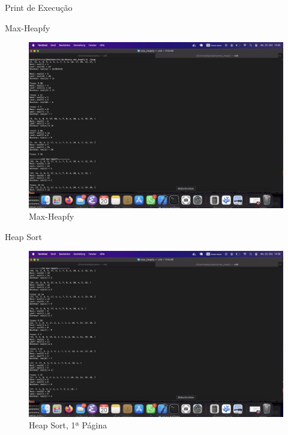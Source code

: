 \documentclass{article}
\begin{document}
    \vspace{0.9cm}

    \centerline{\Large Print de Execução}

    \vspace{0.5cm}

    \centerline{\Huge Max-Heapfy}

    \begin{figure}
        \centering
        \includegraphics[width=1.3\linewidth]{max_heapfy.png}
        \caption{Max-Heapfy}
        \label{fig:fig1}
    \end{figure}

    \clearpage

    \centerline{\Huge Heap Sort}
    \clearpage

    \begin{figure}
        \centering
        \includegraphics[width=1.3\linewidth]{heapsort1.png}
        \caption{Heap Sort, 1ª Página}
        \label{fig:myfig2}
    \end{figure}
\end{document}
